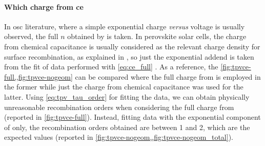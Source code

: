 \paragraph{Which charge from \gls{ce}}
In \gls{osc} literature, where a simple exponential charge \textsl{versus} voltage is usually observed, the full $n$ obtained by  is taken.
In perovskite solar cells, the charge from chemical capacitance is usually considered as the relevant charge density for surface recombination, as explained in , so just the exponential addend is taken from the fit of  data performed with \cref{eq:ce_full} \cite{Du2018,Gelmetti2019,Wheeler2017}.
As a reference, the \cref{fig:tpvce-full,,fig:tpvce-nogeom} can be compared where the full charge from  is employed in the former while just the charge from chemical capacitance was used for the latter.
Using \cref{eq:tpv_tau_order} for fitting the data, we can obtain physically unreasonable recombination orders when considering the full charge from  (reported in \cref{fig:tpvce-full}).
Instead, fitting data with the exponential component of  only, the recombination orders obtained are between 1 and 2, which are the expected values (reported in \cref{fig:tpvce-nogeom,,fig:tpvce-nogeom_total}).

